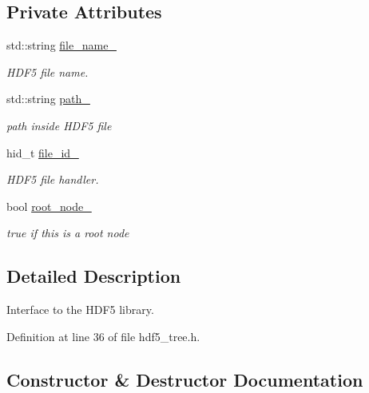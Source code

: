 \subsection*{Private Attributes}
\begin{DoxyCompactItemize}
\item 
std\+::string \hyperlink{classsirius_1_1_h_d_f5__tree_a3af27c600c44298f08392471a57e7040}{file\+\_\+name\+\_\+}
\begin{DoxyCompactList}\small\item\em H\+D\+F5 file name. \end{DoxyCompactList}\item 
std\+::string \hyperlink{classsirius_1_1_h_d_f5__tree_ad1acd4df53bdef0edb7ab9d69d63ff80}{path\+\_\+}
\begin{DoxyCompactList}\small\item\em path inside H\+D\+F5 file \end{DoxyCompactList}\item 
hid\+\_\+t \hyperlink{classsirius_1_1_h_d_f5__tree_a1be4776a9d6b2858a8f083878367b3ac}{file\+\_\+id\+\_\+}
\begin{DoxyCompactList}\small\item\em H\+D\+F5 file handler. \end{DoxyCompactList}\item 
bool \hyperlink{classsirius_1_1_h_d_f5__tree_a5d07fadfbcafa38b174c32fb0700aeef}{root\+\_\+node\+\_\+}
\begin{DoxyCompactList}\small\item\em true if this is a root node \end{DoxyCompactList}\end{DoxyCompactItemize}


\subsection{Detailed Description}
Interface to the H\+D\+F5 library. 

Definition at line 36 of file hdf5\+\_\+tree.\+h.



\subsection{Constructor \& Destructor Documentation}
\hypertarget{classsirius_1_1_h_d_f5__tree_a76a0c9dbffbdf53654a72226c492343c}{}
